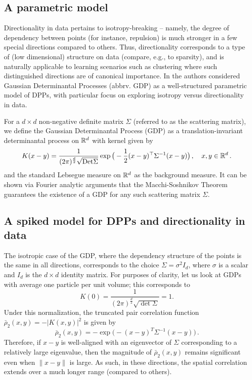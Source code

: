 \subsection{A parametric model}
 Directionality in data pertains to isotropy-breaking -- namely, the degree of dependency between points (for instance, repulsion) is much stronger in a few special directions compared to others. Thus, directionality corresponds to a type of (low dimensional) structure on data (compare, e.g., to sparsity), and is naturally applicable to learning scenarios such as clustering where such distinguished directions are of canonical importance. In \cite{GDP} the authors considered Gaussian Determinantal Processes (abbrv. GDP) as a well-structured parametric model of DPPs, with particular focus on exploring isotropy versus directionality in data.

For a $d \times d$ non-negative definite matrix $\Sigma$ (referred to as the scattering matrix), we define the  Gaussian Determinantal Process (GDP) as a translation-invariant determinantal process on $\mathbb{R}^d$ with kernel given by
$$
K(x-y)=\frac{1}{(2\pi)^{\frac{d}{2}} \sqrt{\mathrm{Det}{\Sigma}}}\exp\big(-\frac{1}{2}(x-y)^\top \Sigma^{-1}(x-y)\big)\,, \quad x,y \in \mathbb{R}^d\,.
$$
and the standard Lebsegue measure on $\mathbb{R}^d$ as the background measure. It can be shown via Fourier analytic arguments that the Macchi-Soshnikov Theorem guarantees the existence of a GDP for any such scattering matrix $\Sigma$.

\subsection{A spiked model for DPPs and directionality in data }
The isotropic case of the GDP, where the dependency structure of the points is the same in all directions, corresponds to the choice $\Sigma = \sigma^2 I_d$, where $\sigma$ is a scalar and $I_d$ is the $d\times d$ identity matrix. For purposes of clarity, let us look at GDPs with average one particle per unit volume; this corresponds to \[K(0)=\frac{1}{(2\pi)^{\frac{d}{2}} \sqrt{\det{\Sigma}}}=1.\] Under this normalization, the truncated pair correlation function $\bar{\rho}_2(x,y)=-|K(x,y)|^2$ is given by \[\bar \rho_2(x,y)= - \exp\big(- (x-y)^T \Sigma^{-1} (x-y)  \big)\,.\] Therefore, if $x - y$ is well-aligned with an eigenvector of $\Sigma$ corresponding to a relatively large eigenvalue, then the magnitude of $\bar{\rho}_2(x, y)$ remains significant even when $\|x - y\|$ is large. As such, in these directions, the spatial correlation extends over a much longer range (compared to others).

